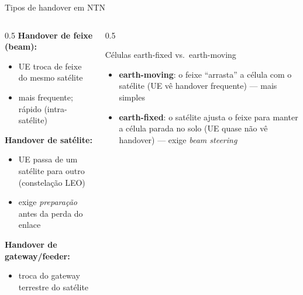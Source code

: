\documentclass[aspectratio=169,11pt]{beamer}
\begin{document}
\begin{frame}{Tipos de handover em NTN}
  \begin{columns}
    \begin{column}{0.5\textwidth}
      \textbf{Handover de feixe (beam):}
      \begin{itemize}
        \item UE troca de feixe do mesmo satélite
        \item mais frequente; rápido (intra-satélite)
      \end{itemize}
      \textbf{Handover de satélite:}
      \begin{itemize}
        \item UE passa de um satélite para outro (constelação LEO)
        \item exige \emph{preparação} antes da perda do enlace
      \end{itemize}
      \textbf{Handover de gateway/feeder:}
      \begin{itemize}
        \item troca do gateway terrestre do satélite
      \end{itemize}
    \end{column}
    \begin{column}{0.5\textwidth}
      \begin{block}{Células earth-fixed vs.\ earth-moving}
        \begin{itemize}
          \item \textbf{earth-moving}: o feixe ``arrasta'' a célula com o satélite (UE vê handover frequente) --- mais simples
          \item \textbf{earth-fixed}: o satélite ajusta o feixe para manter a célula parada no solo (UE quase não vê handover) --- exige \emph{beam steering}
        \end{itemize}
      \end{block}
    \end{column}
  \end{columns}
\end{frame}
\end{document}
